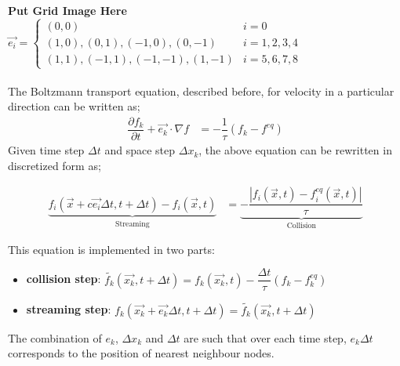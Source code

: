 \documentclass[12pt,a4paper]{report}
\begin{document}
	\textbf{Put Grid Image Here}\\
	$
	\vec{e_{i}} = 
	\begin{cases}
		(0,0) & i = 0\\
		(1,0),(0,1),(-1,0),(0,-1) & i = 1,2,3,4\\
		(1,1),(-1,1),(-1,-1),(1,-1) & i = 5,6,7,8
	\end{cases}
	$\\
	\\
	The Boltzmann transport equation, described before, for velocity 
	in a particular direction can be written as;
	\begin{align}
		\dfrac{\partial f_k}{\partial t} +\vec{e_k}\cdot \nabla f &= -\dfrac{1}{\tau}\left(f_k - f^{eq}\right)
	\end{align}
	Given time step $\Delta t$ and space step $\Delta x_k$, the above 
	equation can be rewritten in discretized form as;

	\begin{align}
		\underbrace{f_i\left(\vec{x} + c\vec{e_i}\Delta t, t+\Delta t\right) - f_i\left(\vec{x}, t\right)}_{\text{Streaming}} &= \underbrace{ -\dfrac{|f_i\left(\vec{x},t\right) - f^{eq}_i\left(\vec{x},t\right)|}{\tau}}_{\text{Collision}}
	\end{align}
	
	This equation is implemented in two parts:
	\begin{itemize}
		\item \textbf{collision step}: $\tilde{f_k}\left(\vec{x_k}, t+\Delta t\right) = f_k\left(\vec{x_k}, t\right) - \dfrac{\Delta t}{\tau}\left(f_k - f^{eq}_k\right)$
		\item \textbf{streaming step}: $f_k\left(\vec{x_k} + \vec{e_k}\Delta t, t+\Delta t\right) = \tilde{f_k}\left(\vec{x_k}, t+\Delta t\right)$
	\end{itemize}
	The combination of $e_k$, $\Delta x_k$ and $\Delta t$ are such that over each time step, $e_k\Delta t$ 
	corresponds to the position of nearest neighbour nodes.	
	
	
\end{document}
